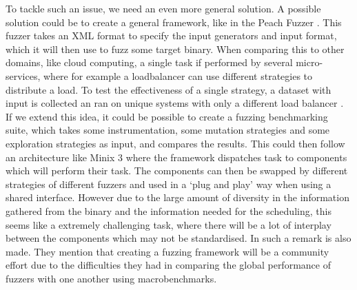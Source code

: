 To tackle such an issue, we need an even more general solution. A possible solution could be to create a general framework, like in the Peach Fuzzer \cite{eddington2011peach}. This fuzzer takes an XML format to specify the input generators and input format, which it will then use to fuzz some target binary. When comparing this to other domains, like cloud computing, a single task if performed by several micro-services, where for example a loadbalancer can use different strategies to distribute a load. To test the effectiveness of a single strategy, a dataset with input is collected an ran on unique systems with only a different load balancer \cite{andreadis2018reference}. If we extend this idea, it could be possible to create a fuzzing benchmarking suite, which takes some instrumentation, some mutation strategies and some exploration strategies as input, and compares the results. This could then follow an architecture like Minix 3 \cite{herder2006minix} where the framework dispatches task to components which will perform their task. The components can then be swapped by different strategies of different fuzzers and used in a `plug and play' way when using a shared interface. However due to the large amount of diversity in the information gathered from the binary and the information needed for the scheduling, this seems like a extremely challenging task, where there will be a lot of interplay between the components which may not be standardised. In \cite{klees2018evaluating} such a remark is also made. They mention that creating a fuzzing framework will be a community effort due to the difficulties they had in comparing the global performance of fuzzers with one another using macrobenchmarks.